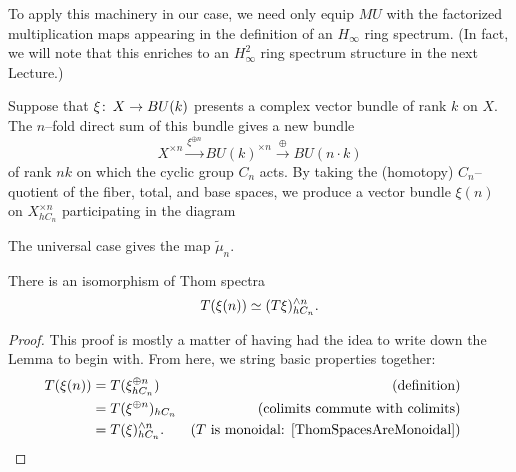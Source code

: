To apply this machinery in our case, we need only equip $MU$ with the factorized multiplication maps appearing in the definition of an $H_\infty$ ring spectrum.  (In fact, we will note that this enriches to an $H_\infty^2$ ring spectrum structure in the next Lecture.)

\begin{definition}
Suppose that $\xi\colon\thinspace X \to BU(k)$ presents a complex vector bundle of rank $k$ on $X$.  The $n$--fold direct sum of this bundle gives a new bundle \[X^{\times n} \xrightarrow{\xi^{\oplus n}} BU(k)^{\times n} \xrightarrow{\oplus} BU(n \cdot k)\] of rank $nk$ on which the cyclic group $C_n$ acts.  By taking the (homotopy) $C_n$--quotient of the fiber, total, and base spaces, we produce a vector bundle $\xi(n)$ on $X^{\times n}_{hC_n}$ participating in the diagram
\begin{center}
\end{center}
The universal case gives the map $\widetilde \mu_n$.
\end{definition}

\begin{lemma}\label{ThomSpectrumOfAssocBundle}
There is an isomorphism of Thom spectra \[T(\xi(n)) \simeq (T\xi)^{\wedge n}_{hC_n}.\]
\end{lemma}
\begin{proof}
This proof is mostly a matter of having had the idea to write down the Lemma to begin with.  From here, we string basic properties together:
\begin{align*}
T(\xi(n)) & = T(\xi^{\oplus n}_{hC_n}) & \text{(definition)} \\
& = T(\xi^{\oplus n})_{hC_n} & \text{(colimits commute with colimits)} \\
& = T(\xi)^{\sm n}_{hC_n}. & \text{($T$ is monoidal: \Cref{ThomSpacesAreMonoidal})} & \qedhere
\end{align*}
\end{proof}

